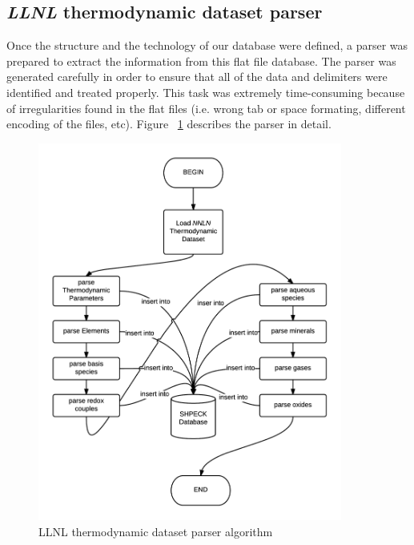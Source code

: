 \subsection{\emph{LLNL} thermodynamic dataset parser}
Once the structure and the technology of our database were defined, a parser was prepared to extract the information from this flat file database. The parser was generated carefully in order to ensure that all of the data and delimiters were identified and treated properly. This task was extremely time-consuming because of irregularities found in the flat files (i.e. wrong tab or space formating, different encoding of the files, etc). Figure ~\ref{fig:parserAlgorithm} describes the parser in detail.

\begin{figure}[ht!]
\centering
\includegraphics[width=100mm]{figures/parser.png}
\caption{LLNL thermodynamic dataset parser algorithm}
\label{fig:parserAlgorithm}
\end{figure}

\newpage

